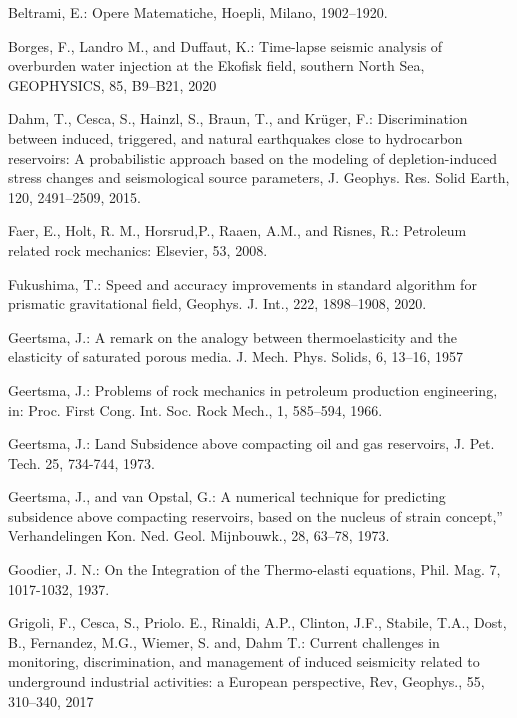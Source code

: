 \documentclass[journal abbreviation, manuscript]{copernicus}
\begin{document}
\begin{thebibliography}{}


Beltrami,  E.: Opere Matematiche, Hoepli, Milano, 1902–1920.

Borges, F., Landro M., and  Duffaut, K.: Time-lapse seismic analysis of overburden water injection at the Ekofisk field, southern North Sea, GEOPHYSICS, 85, B9–B21, 2020

Dahm, T.,  Cesca, S., Hainzl, S., Braun,  T., and Krüger, F.: Discrimination
between induced, triggered, and natural earthquakes close to hydrocarbon reservoirs: A probabilistic approach based on the modeling of depletion-induced stress changes
and seismological source parameters, J. Geophys. Res. Solid Earth, 120,
2491–2509, 2015.


Faer, E.,  Holt, R. M., Horsrud,P., Raaen,  A.M., and Risnes, R.: Petroleum related rock mechanics: Elsevier, 53, 2008.


Fukushima, T.: Speed and accuracy improvements in standard algorithm for prismatic gravitational field, Geophys. J. Int.,  222, 1898–1908,  2020.


Geertsma, J.: A remark on the analogy between thermoelasticity and the
elasticity of saturated porous media. J. Mech. Phys. Solids, 6, 13–16, 1957

Geertsma, J.: Problems of rock mechanics in petroleum production engineering, in: Proc. First Cong. Int. Soc. Rock Mech., 1, 585–594, 1966.

Geertsma, J.: Land Subsidence above compacting oil and gas reservoirs, J. Pet. Tech. 25, 734-744, 1973.

Geertsma, J., and van Opstal, G.: A numerical technique for predicting subsidence above compacting reservoirs, based on the nucleus of strain concept,” Verhandelingen Kon.
Ned. Geol. Mijnbouwk., 28, 63–78, 1973.


Goodier, J. N.: On the Integration of the Thermo-elasti equations, Phil. Mag. 7, 1017-1032, 1937. 

Grigoli, F., Cesca, S., Priolo. E., Rinaldi, A.P., Clinton, J.F., Stabile, T.A., Dost, B., Fernandez, M.G., Wiemer, S. and, Dahm T.: Current challenges in monitoring, discrimination, and management of induced seismicity related to underground industrial activities: a European perspective, Rev, Geophys., 55, 310–340, 2017
 


\end{thebibliography}
\end{document}
